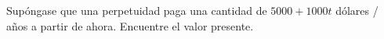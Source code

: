 \item Supóngase que una perpetuidad paga una cantidad de $5000 + 1000t$ dólares / años a partir de ahora. Encuentre el valor presente.
